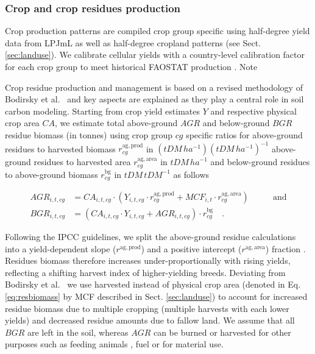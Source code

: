 \documentclass[gc, manuscript]{copernicus}
\begin{document}
\hypertarget{sec:residues}{%
\subsubsection{Crop and crop residues production}\label{sec:residues}}

Crop production patterns are compiled crop group specific using half-degree yield data from LPJmL \citep{schaphoff_lpjml4_2018} as well as half-degree cropland patterns (see Sect. \ref{sec:landuse}). We calibrate cellular yields with a country-level calibration factor for each crop group to meet historical FAOSTAT production \citep{faostat_faostat_2016}. Note

Crop residue production and management is based on a revised methodology of Bodirsky et al.~\citeyearpar{bodirsky_n2o_2012} and key aspects are explained as they play a central role in soil carbon modeling. Starting from crop yield estimates \(Y\) and respective physical crop area \(CA\), we estimate total above-ground \(AGR\) and below-ground \(BGR\) residue biomass (in tonnes) using crop group \(cg\) specific ratios for above-ground residues to harvested biomass \(r^{\mathrm{ag,prod}}_{cg}\) in \((tDM\,ha^{-1})(tDM\,ha^{-1})^{-1}\) above-ground residues to harvested area \(r^{\mathrm{ag,area}}_{cg}\) in \(\unit{tDM\,\unit{ha}^{-1}}\) and below-ground residues to above-ground biomass \(r^{\mathrm{bg}}_{cg}\) in \(\unit{tDM\,\unit{tDM}^{-1}}\) as follows

\begin{equation}
\begin{aligned}
AGR_{i,t,cg} & = CA_{i,t,cg} \cdot \left( Y_{i,t,cg} \cdot  r^{\mathrm{ag,prod}}_{cg} + MCF_{i,t} \cdot r^{\mathrm{ag,area}}_{cg} \right)
\qquad & \textrm{and} \\
BGR_{i,t,cg} & = (CA_{i,t,cg} \cdot Y_{i,t,cg} + AGR_{i,t,cg}) \cdot r^{\mathrm{bg}}_{cg} \quad.
\label{eq:resbiomass}
\end{aligned}
\end{equation}

Following the IPCC guidelines, we split the above-ground residue calculations into a yield-dependent slope (\(r^{\mathrm{ag,prod}}\)) and a positive intercept (\(r^{\mathrm{ag,area}}\)) fraction \citep{hergoualch_n2o_in_ipcc_2019}. Residues biomass therefore increases under-proportionally with rising yields, reflecting a shifting harvest index of higher-yielding breeds.
Deviating from Bodirsky et al.~\citeyearpar{bodirsky_n2o_2012} we use harvested instead of physical crop area (denoted in Eq. \eqref{eq:resbiomass} by MCF described in Sect. \ref{sec:landuse}) to account for increased residue biomass due to multiple cropping (multiple harvests with each lower yields) and decreased residue amounts due to fallow land. We assume that all \(BGR\) are left in the soil, whereas \(AGR\) can be burned or harvested for other purposes such as feeding animals \citep{weindl_livestock_2017}, fuel or for material use.
\end{document}

